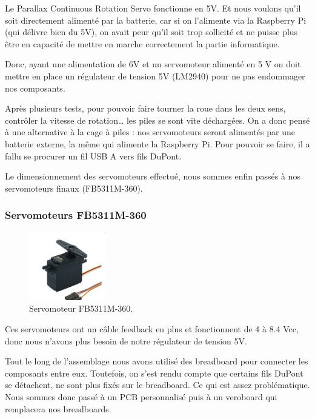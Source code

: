 \documentclass[a4paper,12pt]{report}  %
\begin{document}
Le Parallax Continuous Rotation Servo fonctionne en 5V. Et nous voulons qu’il soit directement alimenté par la batterie, car si on l'alimente via la Raspberry Pi (qui délivre bien du 5V), on avait peur qu’il soit trop sollicité et ne puisse plus être en capacité de mettre en marche correctement la partie informatique.

Donc, ayant une alimentation de 6V et un servomoteur alimenté en 5 V on doit mettre en place un régulateur de tension 5V (LM2940) pour ne pas endommager nos composants.

Après plusieurs tests, pour pouvoir faire tourner la roue dans les deux sens, contrôler la vitesse de rotation… les piles se sont vite déchargées. On a donc pensé à une alternative à la cage à piles : nos servomoteurs seront alimentés par une batterie externe, la même qui alimente la Raspberry Pi. Pour pouvoir se faire, il a fallu se procurer un fil USB A vers fils DuPont.

Le dimensionnement des servomoteurs effectué, nous sommes enfin passés à nos servomoteurs finaux (FB5311M-360). \\

\subsubsection{Servomoteurs FB5311M-360}
\begin{figure}[H]
	\centering
	\includegraphics[width=0.3\textwidth]{./attachments/moteur_servo.jpg}
	\caption{Servomoteur FB5311M-360.}
\end{figure}

Ces servomoteurs ont un câble feedback en plus et fonctionnent de 4 à 8.4 Vcc, donc nous n’avons plus besoin de notre régulateur de tension 5V. 

Tout le long de l’assemblage nous avons utilisé des breadboard pour connecter les composants entre eux. Toutefois, on s’est rendu compte que certains fils DuPont se détachent, ne sont plus fixés sur le breadboard. Ce qui est assez problématique. 
Nous sommes donc passé à un PCB personnalisé puis à un veroboard qui remplacera nos breadboards.
\end{document}
